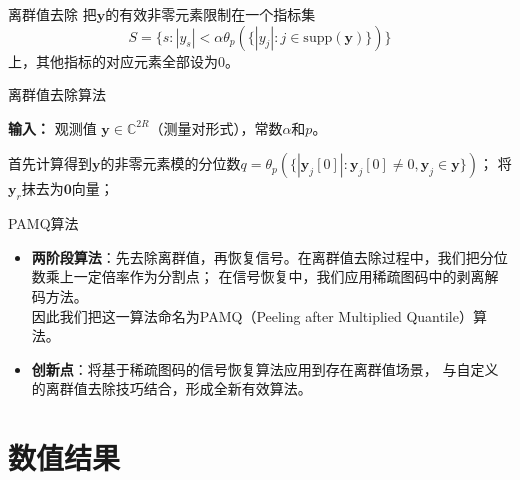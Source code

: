\documentclass{ldr-simple-gray}
\begin{document}
\begin{frame}{离群值去除}
    把$\mathbf{y}$的有效非零元素限制在一个指标集
    \begin{equation*}
        S = \{s: |y_s| < \alpha \theta_p (\{|y_j| : j \in \mathrm{supp} (\mathbf{y})\})\}
    \end{equation*}
    上，其他指标的对应元素全部设为0。
    \begin{algorithm}[H]
        \caption{离群值去除算法\label{Alg:outliers_removal}}
        \hspace*{0.02in} {\bf 输入：} 
        观测值 $\mathbf{y} \in \mathbb{C}^{2R}$（测量对形式），常数$\alpha$和$p$。
        \begin{algorithmic}[1]
            \State 首先计算得到$\mathbf{y}$的非零元素模的分位数$q = \theta_p (\{|\mathbf{y}_j[0]|: \mathbf{y}_j[0] \neq 0, \mathbf{y}_j \in \mathbf{y}\})$；
                    \State 将$\mathbf{y}_r$抹去为$\mathbf{0}$向量；
                \EndIf
            \EndFor
        \end{algorithmic}
    \end{algorithm}
\end{frame}

\begin{frame}{PAMQ算法}
    \begin{itemize}
        \item \textbf{两阶段算法}：先去除离群值，再恢复信号。在离群值去除过程中，我们把分位数乘上一定倍率作为分割点；
        在信号恢复中，我们应用稀疏图码中的剥离解码方法。\\
        因此我们把这一算法命名为PAMQ（Peeling after Multiplied Quantile）算法。
        \item \textbf{创新点}：将基于稀疏图码的信号恢复算法应用到存在离群值场景，
        与自定义的离群值去除技巧结合，形成全新有效算法。
    \end{itemize}
\end{frame}

\section{数值结果}
\end{document}
